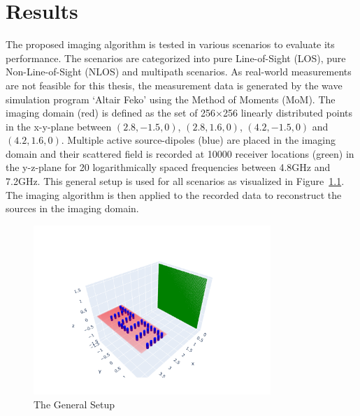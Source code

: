 
\chapter{Results}\label{chapter:results}
The proposed imaging algorithm is tested in various scenarios to evaluate its performance.
The scenarios are categorized into pure Line-of-Sight (LOS), pure Non-Line-of-Sight (NLOS) and multipath scenarios.
As real-world measurements are not feasible for this thesis, the measurement data is generated by the wave simulation program `Altair Feko' using the Method of Moments (MoM).
The imaging domain (red) is defined as the set of 256\(\times \)256 linearly distributed points in the x-y-plane between \((2.8, -1.5, 0)\), \((2.8, 1.6, 0)\), \((4.2, -1.5, 0)\) and \((4.2, 1.6, 0)\).
Multiple active source-dipoles (blue) are placed in the imaging domain and their scattered field is recorded at 10000 receiver locations (green) in the y-z-plane for 20 logarithmically spaced frequencies between 4.8GHz and 7.2GHz.
This general setup is used for all scenarios as visualized in Figure~\ref{fig:general_setup}.
The imaging algorithm is then applied to the recorded data to reconstruct the sources in the imaging domain.

\begin{figure}[ht]
    \centering
    \includegraphics[width=0.8\textwidth]{figures/general_setup.pdf}
    \caption{The General Setup}\label{fig:general_setup}
\end{figure}


